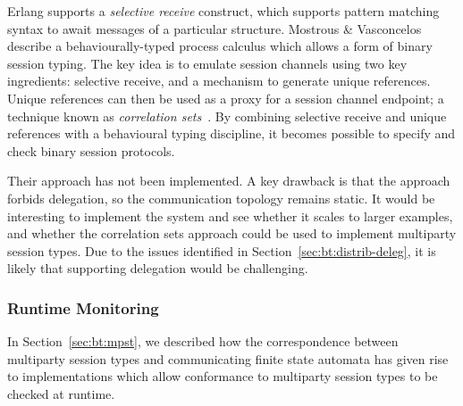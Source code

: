 \documentclass[
graybox,
envcountchap
]{svmult}
\begin{document}
\begin{bibunit}
  Erlang supports a \emph{selective receive} construct, which supports pattern
  matching syntax to await messages of a particular structure.
  Mostrous \& Vasconcelos~\cite{MostrousV11:session-erlang} describe a
  behaviourally-typed process calculus which allows a form of binary session
  typing. The key idea is to emulate session channels using two key ingredients:
  selective receive, and a mechanism to generate unique references. Unique
  references can then be used as a proxy for a session channel endpoint; a
  technique known as \emph{correlation sets}~\cite{Viroli04a:correlation}. By
  combining selective receive and unique references with a behavioural typing
  discipline, it becomes possible to specify and check binary session protocols.

  Their approach has not been implemented. A key drawback is that the approach
  forbids delegation, so the communication topology remains static. It would be
  interesting to implement the system and see whether it scales to larger
  examples, and whether the correlation sets approach could be used to implement
  multiparty session types. Due to the issues identified in
  Section~\ref{sec:bt:distrib-deleg}, it is likely that supporting
  delegation would be challenging.

  \subsubsection{Runtime Monitoring}
  In Section~\ref{sec:bt:mpst}, we described how the correspondence between
  multiparty session types and communicating finite state automata has given
  rise to implementations which allow conformance to multiparty session types to
  be checked at runtime.

  \begin{figure}[t]


\end{figure}
\end{bibunit}
\end{document}
